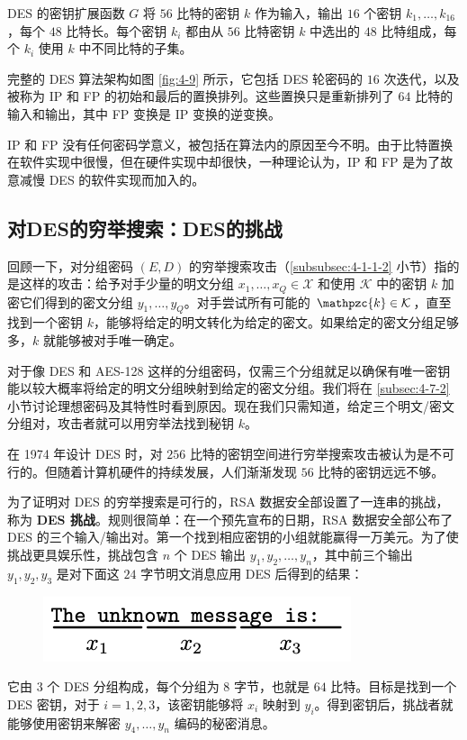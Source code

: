 \begin{snote}[密钥扩展函数。]
DES 的密钥扩展函数 $G$ 将 $56$ 比特的密钥 $k$ 作为输入，输出 $16$ 个密钥 $k_1,\dots,k_{16}$，每个 $48$ 比特长。每个密钥 $k_i$ 都由从 $56$ 比特密钥 $k$ 中选出的 $48$ 比特组成，每个 $k_i$ 使用 $k$ 中不同比特的子集。
\end{snote}

\begin{snote}[DES 算法。]
完整的 DES 算法架构如图 \ref{fig:4-9} 所示，它包括 DES 轮密码的 $16$ 次迭代，以及被称为 IP 和 FP 的初始和最后的置换排列。这些置换只是重新排列了 $64$ 比特的输入和输出，其中 FP 变换是 IP 变换的逆变换。

IP 和 FP 没有任何密码学意义，被包括在算法内的原因至今不明。由于比特置换在软件实现中很慢，但在硬件实现中却很快，一种理论认为，IP 和 FP 是为了故意减慢 DES 的软件实现而加入的。
\end{snote}

\subsection{对DES的穷举搜索：DES的挑战}\label{subsec:4-2-2}

回顾一下，对分组密码 $(E,D)$ 的穷举搜索攻击（\ref{subsubsec:4-1-1-2} 小节）指的是这样的攻击：给予对手少量的明文分组 $x_1,\dots,x_Q\in\mathcal{X}$ 和使用 $\mathcal{K}$ 中的密钥 $k$ 加密它们得到的密文分组 $y_1,\dots,y_Q$。对手尝试所有可能的 $\mathpzc{k}\in\mathcal{K}$，直至找到一个密钥 $k$，能够将给定的明文转化为给定的密文。如果给定的密文分组足够多，$k$ 就能够被对手唯一确定。

对于像 DES 和 AES-128 这样的分组密码，仅需三个分组就足以确保有唯一密钥能以较大概率将给定的明文分组映射到给定的密文分组。我们将在 \ref{subsec:4-7-2} 小节讨论理想密码及其特性时看到原因。现在我们只需知道，给定三个明文/密文分组对，攻击者就可以用穷举法找到秘钥 $k$。

在 1974 年设计 DES 时，对 $256$ 比特的密钥空间进行穷举搜索攻击被认为是不可行的。但随着计算机硬件的持续发展，人们渐渐发现 $56$ 比特的密钥远远不够。

为了证明对 DES 的穷举搜索是可行的，RSA 数据安全部设置了一连串的挑战，称为 \textbf{DES 挑战}。规则很简单：在一个预先宣布的日期，RSA 数据安全部公布了 DES 的三个输入/输出对。第一个找到相应密钥的小组就能赢得一万美元。为了使挑战更具娱乐性，挑战包含 $n$ 个 DES 输出 $y_1,y_2,\dots,y_n$，其中前三个输出 $y_1,y_2,y_3$ 是对下面这 $24$ 字节明文消息应用 DES 后得到的结果：

\begin{figure}[h!]
  \centering
  \includegraphics[width=0.3\linewidth]{figures/chapter4/fig-vac1.png}
\end{figure}
它由 $3$ 个 DES 分组构成，每个分组为 $8$ 字节，也就是 $64$ 比特。目标是找到一个 DES 密钥，对于 $i=1,2,3$，该密钥能够将 $x_i$ 映射到 $y_i$。得到密钥后，挑战者就能够使用密钥来解密 $y_4,\dots,y_n$ 编码的秘密消息。

